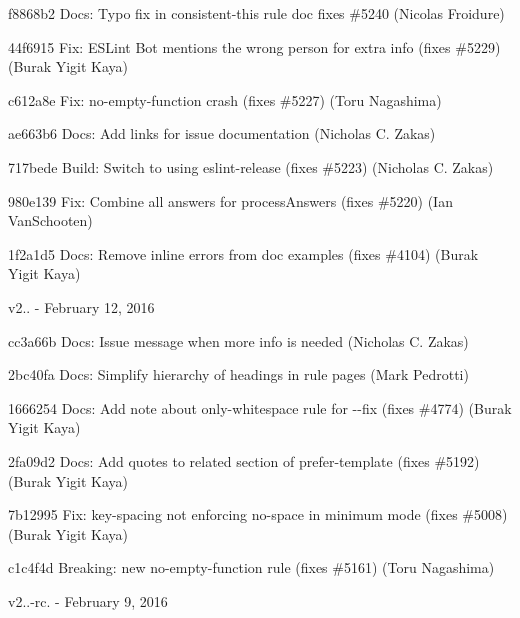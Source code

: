 \begin{DoxyItemize}
\item f8868b2 Docs\+: Typo fix in consistent-\/this rule doc fixes \#5240 (Nicolas Froidure)
\item 44f6915 Fix\+: E\+S\+Lint Bot mentions the wrong person for extra info (fixes \#5229) (Burak Yigit Kaya)
\item c612a8e Fix\+: {\ttfamily no-\/empty-\/function} crash (fixes \#5227) (Toru Nagashima)
\item ae663b6 Docs\+: Add links for issue documentation (Nicholas C. Zakas)
\item 717bede Build\+: Switch to using eslint-\/release (fixes \#5223) (Nicholas C. Zakas)
\item 980e139 Fix\+: Combine all answers for process\+Answers (fixes \#5220) (Ian Van\+Schooten)
\item 1f2a1d5 Docs\+: Remove inline errors from doc examples (fixes \#4104) (Burak Yigit Kaya)
\end{DoxyItemize}

v2.. -\/ February 12, 2016


\begin{DoxyItemize}
\item cc3a66b Docs\+: Issue message when more info is needed (Nicholas C. Zakas)
\item 2bc40fa Docs\+: Simplify hierarchy of headings in rule pages (Mark Pedrotti)
\item 1666254 Docs\+: Add note about only-\/whitespace rule for {\ttfamily -\/-\/fix} (fixes \#4774) (Burak Yigit Kaya)
\item 2fa09d2 Docs\+: Add {\ttfamily quotes} to related section of {\ttfamily prefer-\/template} (fixes \#5192) (Burak Yigit Kaya)
\item 7b12995 Fix\+: {\ttfamily key-\/spacing} not enforcing no-\/space in minimum mode (fixes \#5008) (Burak Yigit Kaya)
\item c1c4f4d Breaking\+: new {\ttfamily no-\/empty-\/function} rule (fixes \#5161) (Toru Nagashima)
\end{DoxyItemize}

v2..-\/rc. -\/ February 9, 2016



